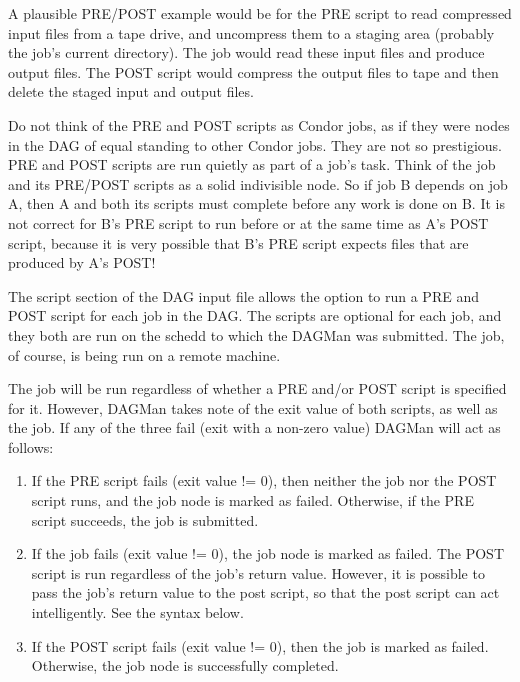 \begin{description}
A plausible PRE/POST example would be for the PRE script to read compressed
input files from a tape drive, and uncompress them to a staging area (probably
the job's current directory).  The job would read these input files and
produce output files.  The POST script would compress the output files to
tape and then delete the staged input and output files.

Do not think of the PRE and POST scripts as Condor jobs, as if they were nodes
in the DAG of equal standing to other Condor jobs.  They are not so
prestigious.  PRE and POST scripts are run quietly as part of a job's task.
Think of the job and its PRE/POST scripts as a solid indivisible node.  So if
job B depends on job A, then A and both its scripts must complete before any
work is done on B.  It is not correct for B's PRE script to run before or at
the same time as A's POST script, because it is very possible that B's PRE
script expects files that are produced by A's POST!

The script section of the DAG input file allows the option to run a PRE and
POST script for each job in the DAG.  The scripts are optional for each job,
and they both are run on the schedd to which the DAGMan was submitted.  The
job, of course, is being run on a remote machine.

The job will be run regardless of whether a PRE and/or POST script is
specified for it.  However, DAGMan takes note of the exit value of both
scripts, as well as the job.  If any of the three fail (exit with a non-zero
value) DAGMan will act as follows:

\begin{enumerate}

\item If the PRE script fails (exit value != 0), then neither the job nor
the POST script runs, and the job node is marked as failed.  Otherwise, if the
PRE script succeeds, the job is submitted.

\item If the job fails (exit value != 0), the job node is marked as failed.
The POST script is run regardless of the job's return value.  However, it is
possible to pass the job's return value to the post script, so that the post
script can act intelligently.  See the syntax below.

\item If the POST script fails (exit value != 0), then the job is marked as
failed.  Otherwise, the job node is successfully completed.

\end{enumerate}


\end{description}
